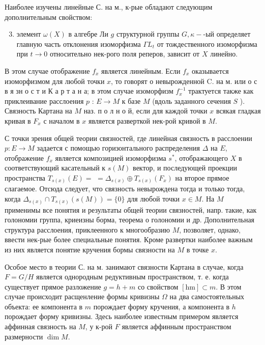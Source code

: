 \documentclass[10pt]{article}
\begin{document}
Наиболее изучены линейные С. на м., к-рые обладают следующим дополнительным свойством:



\begin{enumerate}

  \setcounter{enumi}{2}

  \item элемент $\omega(X)$ в алгебре Ли $g$ структурной группы $G, \kappa-$-ый определяет главную часть отклонения изоморфизма $\Gamma L_{t}$ от тождественного изоморфизма при $t \rightarrow 0$ относительно нек-рого поля реперов, зависит от $X$ линейно.

\end{enumerate}



В этом случае отображение $f_{x}$ является линейным. Если $f_{x}$ оказывается изоморфизмом для любой точки $x$, то говорят о невырожденной $\mathrm{C}$. на м. или о с в я зн о с т и К а р т а н а; в этом случае изоморфизм $f_{x}^{-1}$ трактуется также как приклеивание расслоения $p$ : $E \rightarrow M$ к базе $M$ (вдоль заданного сечения $S$ ). Связность Картана на $M$ наз. п о л н о й, если для каждой точки $x$ всякая гладкая кривая в $F_{x}$ с началом в $x$ является разверткой нек-рой кривой в $M$.



С точки зрения общей теории связностей, где линейная связность в расслоении $p: E \rightarrow M$ задается с помощью горизонтального распределения $\Delta$ на $E$, отображение $f_{x}$ является композицией изоморфизма $s^{*}$, отображающего $X$ в соответствующий касательный к $s(M)$ вектор, и последующей проекции пространства $T_{s(x)}(E)=$ $=\Delta_{s(x)} \oplus T_{s(x)}\left(F_{x}\right)$ на второе прямое слагаемое. Отсюда следует, что связность невырождена тогда и только тогда, когда $\Delta_{s(x)} \cap T_{s(x)}(s(M))=\{0\}$ для любой точки $x \in M$. На $M$ применимы все понятия и результаты общей теории связностей, напр. такие, как голономии группа, криеизны борма, теорема о голономии и др. Дополнительная структура расслоения, приклеенного к многообразию $M$, позволяет, однако, ввести нек-рые более специальные понятия. Кроме развертки наиболее важным из них является понятие кручения бормы связности на $M$ в точке $x$.



Особое место в теории С. на м. занимают связности Картана в случае, когда $F=G / H$ является однородным редуктивным пространством, т. е. когда существует прямое разложение $g=h+m$ со свойством $[\mathrm{hm}] \subset m$. В этом случае происходит расщенление формы кривизны $\Omega$ на два самостоятельных объекта: ее компонента в $m$ порождает форму кручения, а компонента в $h$ порождает форму кривизны. Здесь наиболее известным примером является аффинная связность на $M$, у к-рой $F$ является аффинным пространством размерности $\operatorname{dim} M$.
\end{document}
